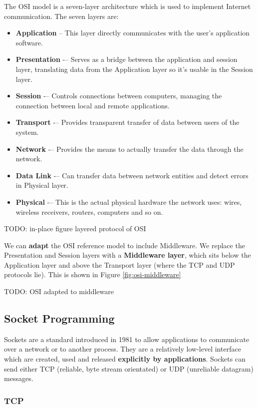 \documentclass{article}
\begin{document}
The OSI model is a seven-layer architecture which is used to implement Internet communication. The seven layers are:
\begin{itemize}
	\item \textbf{Application} -- This layer directly communicates with the user's application software.
	\item \textbf{Presentation} -– Serves as a bridge between the application and session layer, translating data from the Application layer so it's usable in the Session layer.
	\item \textbf{Session} -– Controls connections between computers, managing the connection between local and remote applications.
	\item \textbf{Transport} -– Provides transparent transfer of data between users of the system.
	\item \textbf{Network} -– Provides the means to actually transfer the data through the network.
	\item \textbf{Data Link} -– Can transfer data between network entities and detect errors in Physical layer.
	\item \textbf{Physical} -– This is the actual physical hardware the network uses: wires, wireless receivers, routers, computers and so on.
\end{itemize}

TODO: in-place figure layered protocol of OSI

We can \textbf{adapt} the OSI reference model to include Middleware. We replace the Presentation and Session layers with a \textbf{Middleware layer}, which sits below the Application layer and above the Transport layer (where the TCP and UDP protocols lie). This is shown in Figure \ref{fig:osi-middleware}

TODO: OSI adapted to middleware

\subsection{Socket Programming}

Sockets are a standard introduced in 1981 to allow applications to communicate over a network or to another process. They are a relatively low-level interface which are created, used and released \textbf{explicitly by applications}. Sockets can send either TCP (reliable, byte stream orientated) or UDP (unreliable datagram) messages. 

\subsubsection{TCP}
\end{document}
